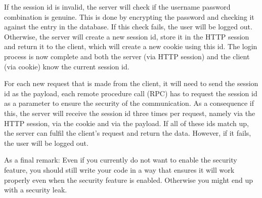 If the session id is invalid, the server will check if the username password combination is genuine. This is done by encrypting the password and checking it against the entry in the database. If this check fails, the user will be logged out. Otherwise, the server will create a new session id, store it in the HTTP session and return it to the client, which will create a new cookie using this id. The login process is now complete and both the server (via HTTP session) and the client (via cookie) know the current session id.

For each new request that is made from the client, it will need to send the session id as the payload, \ie each remote procedure call (RPC) has to request the session id as a parameter to ensure the security of the communication. As a consequence if this, the server will receive the session id three times per request, namely via the HTTP session, via the cookie and via the payload. If all of these ids match up, the server can fulfil the client's request and return the data. However, if it fails, the user will be logged out.

As a final remark: Even if you currently do not want to enable the security feature, you should still write your code in a way that ensures it will work properly even when the security feature is enabled. Otherwise you might end up with a security leak.